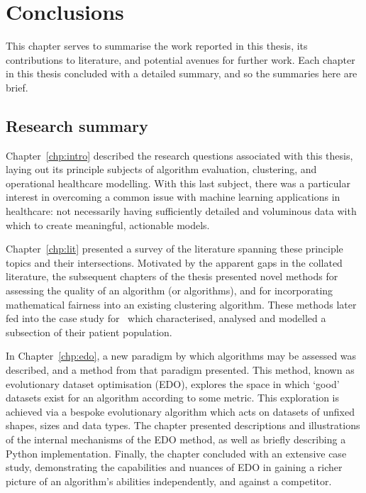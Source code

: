 \chapter{Conclusions}\label{chp:conc}

This chapter serves to summarise the work reported in this thesis, its
contributions to literature, and potential avenues for further work. Each
chapter in this thesis concluded with a detailed summary, and so the summaries
here are brief.


\section{Research summary}

Chapter~\ref{chp:intro} described the research questions associated with this
thesis, laying out its principle subjects of algorithm evaluation, clustering,
and operational healthcare modelling. With this last subject, there was a
particular interest in overcoming a common issue with machine learning
applications in healthcare: not necessarily having sufficiently detailed and
voluminous data with which to create meaningful, actionable models.

Chapter~\ref{chp:lit} presented a survey of the literature spanning these
principle topics and their intersections. Motivated by the apparent gaps in the
collated literature, the subsequent chapters of the thesis presented novel
methods for assessing the quality of an algorithm (or algorithms), and for
incorporating mathematical fairness into an existing clustering algorithm. These
methods later fed into the case study for \ctmuhb\ which characterised, analysed
and modelled a subsection of their patient population.

In Chapter~\ref{chp:edo}, a new paradigm by which algorithms may be assessed was
described, and a method from that paradigm presented. This method, known as
evolutionary dataset optimisation (EDO), explores the space in which `good'
datasets exist for an algorithm according to some metric. This exploration is
achieved via a bespoke evolutionary algorithm which acts on datasets of unfixed
shapes, sizes and data types. The chapter presented descriptions and
illustrations of the internal mechanisms of the EDO method, as well as briefly
describing a Python implementation. Finally, the chapter concluded with an
extensive case study, demonstrating the capabilities and nuances of EDO in
gaining a richer picture of an algorithm's abilities independently, and against
a competitor.


